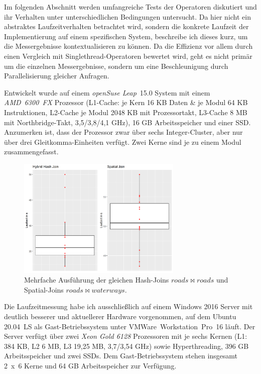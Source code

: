\documentclass[a4paper,12pt,twoside]{article}
\newcommand{\Fb}[1]{\textit{#1}} %
\begin{document}
Im folgenden Abschnitt werden umfangreiche Tests der Operatoren diskutiert und ihr Verhalten unter unterschiedlichen Bedingungen untersucht. Da hier nicht ein abstraktes Laufzeitverhalten betrachtet wird, sondern die konkrete Laufzeit der Implementierung auf einem spezifischen System, beschreibe ich dieses kurz, um die Messergebnisse kontextualisieren zu können. Da die Effizienz vor allem durch einen Vergleich mit Singlethread-Operatoren bewertet wird, geht es nicht primär um die einzelnen Messergebnisse, sondern um eine Beschleunigung durch Parallelisierung gleicher Anfragen. 

Entwickelt wurde auf einem \Fb{openSuse Leap}~15.0 System mit einem \Fb{AMD~6300~FX} Prozessor (L1-Cache: je Kern 16 KB Daten \& je Modul 64 KB Instruktionen, L2-Cache je Modul 2048 KB mit Prozessortakt, L3-Cache 8 MB mit Northbridge-Takt, 3,5/3,8/4,1 GHz), 16 GB Arbeitsspeicher und einer SSD. Anzumerken ist, dass der Prozessor zwar über
sechs Integer-Cluster, aber nur über drei Gleitkomma-Einheiten verfügt. Zwei Kerne sind je zu einem Modul zusammengefasst.

\begin{figure}
	\centering
	\includegraphics[width=0.70\textwidth]{Bilder/streuung.png}
	\caption{Mehrfache Ausführung der gleichen Hash-Joins $roads \bowtie roads$ und Spatial-Joins $roads \bowtie waterways$.}
	\label{img:streuung}
\end{figure}

Die Laufzeitmessung  habe ich ausschließlich auf einem Windows 2016 Server mit deutlich besserer und aktuellerer Hardware vorgenommen, auf dem Ubuntu 20.04~LS als Gast-Betriebssystem unter VMWare~Workstation~Pro~16 läuft. Der Server verfügt über zwei \Fb{Xeon Gold 6128} Prozessoren mit je sechs Kernen (L1: 384 KB, L2 6 MB, L3 19,25 MB, 3,7/3,54 GHz) sowie Hyperthreading, 396 GB Arbeitsspeicher und zwei SSDs. Dem Gast-Betriebssystem stehen insgesamt 2~x~6 Kerne und 64 GB Arbeitsspeicher zur Verfügung.
\end{document}
